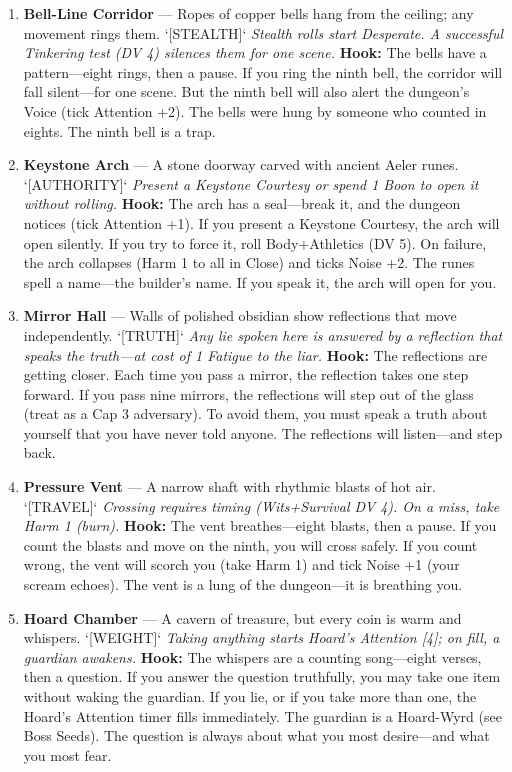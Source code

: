 \begin{enumerate}
\item \textbf{Bell-Line Corridor} --- Ropes of copper bells hang from the ceiling; any movement rings them. `[STEALTH]`
  \hfill \textit{Stealth rolls start Desperate. A successful Tinkering test (DV 4) silences them for one scene.}
  \textbf{Hook:} The bells have a pattern---eight rings, then a pause. If you ring the ninth bell, the corridor will fall silent---for one scene. But the ninth bell will also alert the dungeon's Voice (tick Attention +2). The bells were hung by someone who counted in eights. The ninth bell is a trap.

\item \textbf{Keystone Arch} --- A stone doorway carved with ancient Aeler runes. `[AUTHORITY]`
  \hfill \textit{Present a Keystone Courtesy or spend 1 Boon to open it without rolling.}
  \textbf{Hook:} The arch has a seal---break it, and the dungeon notices (tick Attention +1). If you present a Keystone Courtesy, the arch will open silently. If you try to force it, roll Body+Athletics (DV 5). On failure, the arch collapses (Harm 1 to all in Close) and ticks Noise +2. The runes spell a name---the builder's name. If you speak it, the arch will open for you.

\item \textbf{Mirror Hall} --- Walls of polished obsidian show reflections that move independently. `[TRUTH]`
  \hfill \textit{Any lie spoken here is answered by a reflection that speaks the truth---at cost of 1 Fatigue to the liar.}
  \textbf{Hook:} The reflections are getting closer. Each time you pass a mirror, the reflection takes one step forward. If you pass nine mirrors, the reflections will step out of the glass (treat as a Cap 3 adversary). To avoid them, you must speak a truth about yourself that you have never told anyone. The reflections will listen---and step back.

\item \textbf{Pressure Vent} --- A narrow shaft with rhythmic blasts of hot air. `[TRAVEL]`
  \hfill \textit{Crossing requires timing (Wits+Survival DV 4). On a miss, take Harm 1 (burn).}
  \textbf{Hook:} The vent breathes---eight blasts, then a pause. If you count the blasts and move on the ninth, you will cross safely. If you count wrong, the vent will scorch you (take Harm 1) and tick Noise +1 (your scream echoes). The vent is a lung of the dungeon---it is breathing you.

\item[J] \textbf{Hoard Chamber} --- A cavern of treasure, but every coin is warm and whispers. `[WEIGHT]`
  \hfill \textit{Taking anything starts Hoard's Attention [4]; on fill, a guardian awakens.}
  \textbf{Hook:} The whispers are a counting song---eight verses, then a question. If you answer the question truthfully, you may take one item without waking the guardian. If you lie, or if you take more than one, the Hoard's Attention timer fills immediately. The guardian is a Hoard-Wyrd (see Boss Seeds). The question is always about what you most desire---and what you most fear.


\end{enumerate}

